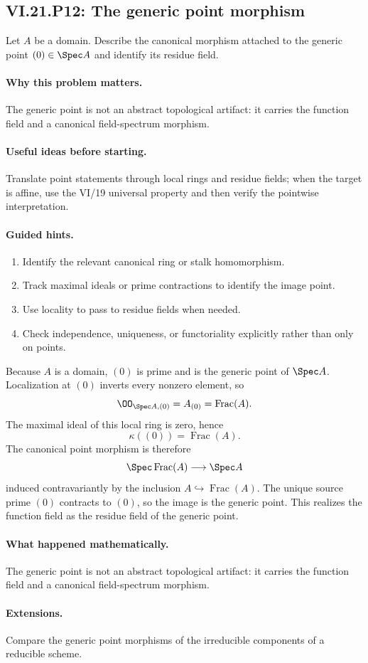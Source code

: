 \subsection*{VI.21.P12: The generic point morphism}
\begin{problem}\label{prob:vi21-p12}
Let $A$ be a domain.  Describe the canonical morphism attached to the generic point $(0)\in\Spec A$ and identify its residue field.
\end{problem}

\ifdefined\FullProblemDossiers
\paragraph{Why this problem matters.}
The generic point is not an abstract topological artifact: it carries the function field and a canonical field-spectrum morphism.

\paragraph{Useful ideas before starting.}
Translate point statements through local rings and residue fields; when the target is affine, use the VI/19 universal property and then verify the pointwise interpretation.

\paragraph{Guided hints.}
\begin{enumerate}
\item Identify the relevant canonical ring or stalk homomorphism.
\item Track maximal ideals or prime contractions to identify the image point.
\item Use locality to pass to residue fields when needed.
\item Check independence, uniqueness, or functoriality explicitly rather than only on points.
\end{enumerate}

\begin{solution}
Because $A$ is a domain, $(0)$ is prime and is the generic point of $\Spec A$.  Localization at
$(0)$ inverts every nonzero element, so
\[
\OO_{\Spec A,(0)}=A_{(0)}=\operatorname{Frac}(A).
\]
The maximal ideal of this local ring is zero, hence
\[
\kappa((0))=\operatorname{Frac}(A).
\]
The canonical point morphism is therefore
\[
\Spec\operatorname{Frac}(A)\longrightarrow\Spec A
\]
induced contravariantly by the inclusion $A\hookrightarrow\operatorname{Frac}(A)$.  The unique
source prime $(0)$ contracts to $(0)$, so the image is the generic point.  This realizes the
function field as the residue field of the generic point.
\end{solution}

\paragraph{What happened mathematically.}
The generic point is not an abstract topological artifact: it carries the function field and a canonical field-spectrum morphism.

\paragraph{Extensions.}
Compare the generic point morphisms of the irreducible components of a reducible scheme.
\fi

